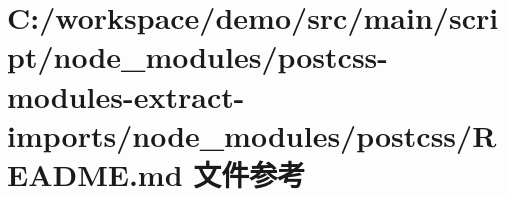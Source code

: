 \hypertarget{node__modules_2postcss-modules-extract-imports_2node__modules_2postcss_2_r_e_a_d_m_e_8md}{}\section{C\+:/workspace/demo/src/main/script/node\+\_\+modules/postcss-\/modules-\/extract-\/imports/node\+\_\+modules/postcss/\+R\+E\+A\+D\+ME.md 文件参考}
\label{node__modules_2postcss-modules-extract-imports_2node__modules_2postcss_2_r_e_a_d_m_e_8md}
